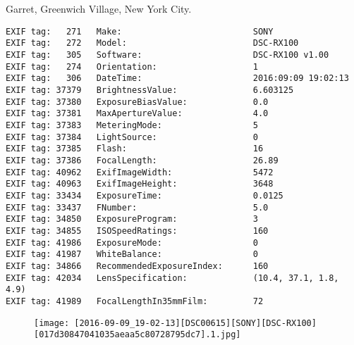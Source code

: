 \section{\protect{}}
\noindent Garret, Greenwich Village, New York City.
\noindent
\begin{lstlisting}
EXIF tag:   271   Make:                          SONY
EXIF tag:   272   Model:                         DSC-RX100
EXIF tag:   305   Software:                      DSC-RX100 v1.00
EXIF tag:   274   Orientation:                   1
EXIF tag:   306   DateTime:                      2016:09:09 19:02:13
EXIF tag: 37379   BrightnessValue:               6.603125
EXIF tag: 37380   ExposureBiasValue:             0.0
EXIF tag: 37381   MaxApertureValue:              4.0
EXIF tag: 37383   MeteringMode:                  5
EXIF tag: 37384   LightSource:                   0
EXIF tag: 37385   Flash:                         16
EXIF tag: 37386   FocalLength:                   26.89
EXIF tag: 40962   ExifImageWidth:                5472
EXIF tag: 40963   ExifImageHeight:               3648
EXIF tag: 33434   ExposureTime:                  0.0125
EXIF tag: 33437   FNumber:                       5.0
EXIF tag: 34850   ExposureProgram:               3
EXIF tag: 34855   ISOSpeedRatings:               160
EXIF tag: 41986   ExposureMode:                  0
EXIF tag: 41987   WhiteBalance:                  0
EXIF tag: 34866   RecommendedExposureIndex:      160
EXIF tag: 42034   LensSpecification:             (10.4, 37.1, 1.8, 4.9)
EXIF tag: 41989   FocalLengthIn35mmFilm:         72

\end{lstlisting}
\clearpage
\begin{figure}
\raggedleft
\texttt{[image: [2016-09-09\_19-02-13][DSC00615][SONY][DSC-RX100][017d30847041035aeaa5c80728795dc7].1.jpg]}
\end{figure}


\clearpage
